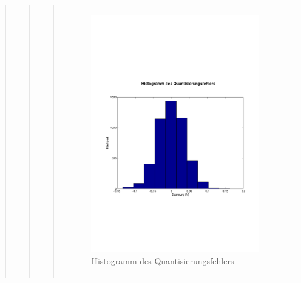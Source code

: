 \begin{quote}
\begin{quote}
\begin{quote}
\begin{center}
\begin{tabular}{ll}
                    \begin{minipage}{0.6\textwidth}
                        \begin{figure}[H]
                            \includegraphics[scale=0.4, trim = 0cm 7cm 0cm
                            7.5cm, clip]
                            {./Bilder/sin100_Histogramm}
                              \caption{Histogramm des Quantisierungsfehlers}
                        \end{figure}
                    \end{minipage}
                
                \end{tabular}
            \end{center}
            \vspace{1em}
            
            

\end{quote}
\end{quote}
\end{quote}
